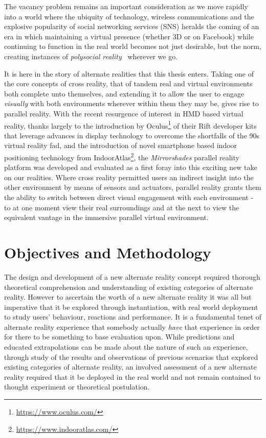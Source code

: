 The vacancy problem remains an important consideration as we move rapidly into a world where the ubiquity of technology, wireless communications and the explosive popularity of social networking services (SNS) heralds the coming of an era in which maintaining a virtual presence (whether 3D or on Facebook) while continuing to function in the real world becomes not just desirable, but the norm, creating instances of \textit{polysocial reality}~\cite{Applin2012} wherever we go.

It is here in the story of alternate realities that this thesis enters. Taking one of the core concepts of cross reality, that of tandem real and virtual environments both complete unto themselves, and extending it to allow the user to engage \textit{visually} with both environments wherever within them they may be, gives rise to parallel reality. With the recent resurgence of interest in HMD based virtual reality, thanks largely to the introduction by Oculus\footnote{\url{https://www.oculus.com/}} of their Rift developer kits that leverage advances in display technology to overcome the shortfalls of the 90s virtual reality fad, and the introduction of novel smartphone based indoor positioning technology from IndoorAtlas\footnote{\url{https://www.indooratlas.com/}}, the \textit{Mirrorshades} parallel reality platform was developed and evaluated as a first foray into this exciting new take on our realities. Where cross reality permitted users an indirect insight into the other environment by means of sensors and actuators, parallel reality grants them the ability to switch between direct visual engagement with each environment - to at one moment view their real surroundings and at the next to view the equivalent vantage in the immersive parallel virtual environment.


\section{Objectives and Methodology}

The design and development of a new alternate reality concept required thorough theoretical comprehension and understanding of existing categories of alternate reality. However to ascertain the worth of a new alternate reality it was all but imperative that it be explored through instantiation, with real world deployment to study users' behaviour, reactions and performance. It is a fundamental tenet of alternate reality experience that somebody actually \textit{have} that experience in order for there to be something to base evaluation upon. While predictions and educated extrapolations can be made about the nature of such an experience, through study of the results and observations of previous scenarios that explored existing categories of alternate reality, an involved assessment of a new alternate reality required that it be deployed in the real world and not remain contained to thought experiment or theoretical postulation.

